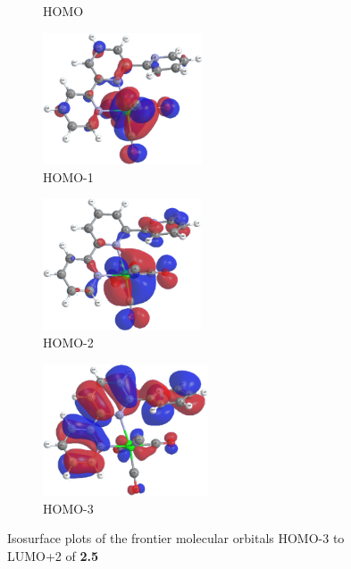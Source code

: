 \begin{figure}[!ht]
\begin{subfigure}[b]{0.31\textwidth}
  \caption{HOMO}
 \end{subfigure}
 \begin{subfigure}[b]{0.31\textwidth}
  \includegraphics[clip=true, width=\textwidth, height=39mm, keepaspectratio]{images/mos/5h-1.eps}
  \caption{HOMO-1}
 \end{subfigure}
 \begin{subfigure}[b]{0.31\textwidth}
  \includegraphics[clip=true, width=\textwidth, height=39mm, keepaspectratio]{images/mos/5h-2.eps}
  \caption{HOMO-2}
 \end{subfigure}
 \begin{subfigure}[b]{0.31\textwidth}
  \includegraphics[clip=true, width=\textwidth, height=39mm, keepaspectratio]{images/mos/5h-3.eps}
  \caption{HOMO-3}
 \end{subfigure}
\caption[Molecular orbitals HOMO-3 to LUMO+2 of \textbf{2.5}]{Isosurface plots of the frontier molecular orbitals HOMO-3 to LUMO+2 of \textbf{2.5}}
\label{fig.mo25}
\end{figure} 

